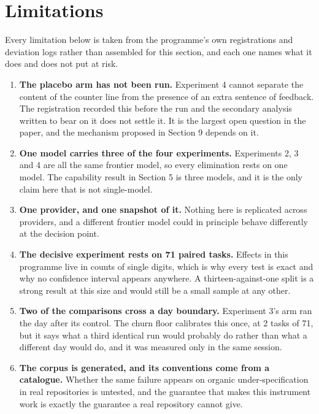 \documentclass[11pt]{article}
\begin{document}
\section{Limitations}

Every limitation below is taken from the programme's own registrations and deviation logs rather than assembled for this section, and each one names what it does and does not put at risk.

\begin{enumerate}\setlength{\itemsep}{4pt}

\item \textbf{The placebo arm has not been run.} Experiment 4 cannot separate the content of the counter line from the presence of an extra sentence of feedback. The registration recorded this before the run and the secondary analysis written to bear on it does not settle it. It is the largest open question in the paper, and the mechanism proposed in Section 9 depends on it.

\item \textbf{One model carries three of the four experiments.} Experiments 2, 3 and 4 are all the same frontier model, so every elimination rests on one model. The capability result in Section 5 is three models, and it is the only claim here that is not single-model.

\item \textbf{One provider, and one snapshot of it.} Nothing here is replicated across providers, and a different frontier model could in principle behave differently at the decision point.

\item \textbf{The decisive experiment rests on 71 paired tasks.} Effects in this programme live in counts of single digits, which is why every test is exact and why no confidence interval appears anywhere. A thirteen-against-one split is a strong result at this size and would still be a small sample at any other.

\item \textbf{Two of the comparisons cross a day boundary.} Experiment 3's arm ran the day after its control. The churn floor calibrates this once, at 2 tasks of 71, but it says what a third identical run would probably do rather than what a different day would do, and it was measured only in the same session.

\item \textbf{The corpus is generated, and its conventions come from a catalogue.} Whether the same failure appears on organic under-specification in real repositories is untested, and the guarantee that makes this instrument work is exactly the guarantee a real repository cannot give.


\end{enumerate}
\end{document}
